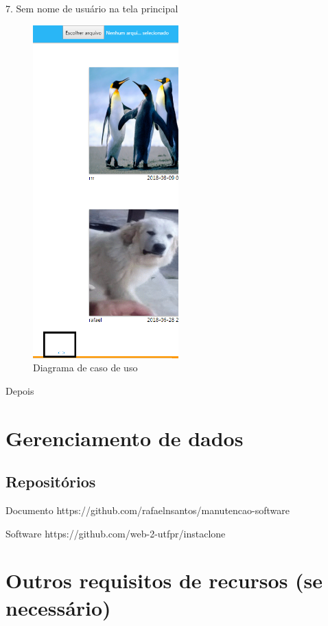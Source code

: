 7. Sem nome de usuário na tela principal
\begin{figure}[ht]
	\centering
	\includegraphics[width=0.5\textwidth]{./imagens/paginas.png}
	\caption{Diagrama de caso de uso}
	\label{fig:casoDeUso}
\end{figure}

\pagebreak

Depois


\section{Gerenciamento de dados}

\subsection{Repositórios}
Documento
https://github.com/rafaelnsantos/manutencao-software

Software
https://github.com/web-2-utfpr/instaclone

\section{Outros requisitos de recursos (se necessário)}
